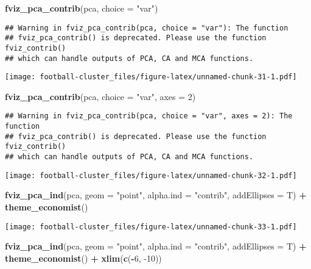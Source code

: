 \documentclass[]{article}
\newenvironment{Shaded}{\begin{snugshade}}{\end{snugshade}}
\newcommand{\DataTypeTok}[1]{\textcolor[rgb]{0.13,0.29,0.53}{#1}}
\newcommand{\DecValTok}[1]{\textcolor[rgb]{0.00,0.00,0.81}{#1}}
\newcommand{\KeywordTok}[1]{\textcolor[rgb]{0.13,0.29,0.53}{\textbf{#1}}}
\newcommand{\NormalTok}[1]{#1}
\newcommand{\OperatorTok}[1]{\textcolor[rgb]{0.81,0.36,0.00}{\textbf{#1}}}
\newcommand{\StringTok}[1]{\textcolor[rgb]{0.31,0.60,0.02}{#1}}
\begin{document}
\begin{Shaded}
\begin{Highlighting}[]
\KeywordTok{fviz_pca_contrib}\NormalTok{(pca, }\DataTypeTok{choice =} \StringTok{"var"}\NormalTok{)}
\end{Highlighting}
\end{Shaded}

\begin{verbatim}
## Warning in fviz_pca_contrib(pca, choice = "var"): The function
## fviz_pca_contrib() is deprecated. Please use the function fviz_contrib()
## which can handle outputs of PCA, CA and MCA functions.
\end{verbatim}

\texttt{[image: football-cluster\_files/figure-latex/unnamed-chunk-31-1.pdf]}

\begin{Shaded}
\begin{Highlighting}[]
\KeywordTok{fviz_pca_contrib}\NormalTok{(pca, }\DataTypeTok{choice =} \StringTok{"var"}\NormalTok{, }\DataTypeTok{axes =} \DecValTok{2}\NormalTok{)}
\end{Highlighting}
\end{Shaded}

\begin{verbatim}
## Warning in fviz_pca_contrib(pca, choice = "var", axes = 2): The function
## fviz_pca_contrib() is deprecated. Please use the function fviz_contrib()
## which can handle outputs of PCA, CA and MCA functions.
\end{verbatim}

\texttt{[image: football-cluster\_files/figure-latex/unnamed-chunk-32-1.pdf]}

\begin{Shaded}
\begin{Highlighting}[]
\KeywordTok{fviz_pca_ind}\NormalTok{(pca, }\DataTypeTok{geom =} \StringTok{"point"}\NormalTok{, }\DataTypeTok{alpha.ind =} \StringTok{"contrib"}\NormalTok{, }\DataTypeTok{addEllipses =}\NormalTok{ T) }\OperatorTok{+}\StringTok{ }\KeywordTok{theme_economist}\NormalTok{()}
\end{Highlighting}
\end{Shaded}

\texttt{[image: football-cluster\_files/figure-latex/unnamed-chunk-33-1.pdf]}

\begin{Shaded}
\begin{Highlighting}[]
\KeywordTok{fviz_pca_ind}\NormalTok{(pca, }\DataTypeTok{geom =} \StringTok{"point"}\NormalTok{, }
             \DataTypeTok{alpha.ind =} \StringTok{"contrib"}\NormalTok{, }\DataTypeTok{addEllipses =}\NormalTok{ T) }\OperatorTok{+}\StringTok{ }\KeywordTok{theme_economist}\NormalTok{() }\OperatorTok{+}
\StringTok{  }\KeywordTok{xlim}\NormalTok{(}\KeywordTok{c}\NormalTok{(}\OperatorTok{-}\DecValTok{6}\NormalTok{, }\DecValTok{-10}\NormalTok{))}
\end{Highlighting}
\end{Shaded}
\end{document}
